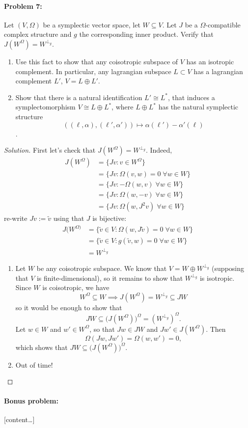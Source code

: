 \paragraph{Problem 7:} Let $(V,\Omega)$ be a symplectic vector space, let $W\subseteq V$. Let $J$ be a $\Omega$-compatible complex structure and $g$ the corresponding inner product. Verify that $J(W^{\Omega} )=W^{\perp_{g}}$.
\begin{enumerate}[label=\alph*.]
	\item Use this fact to show that any coisotropic subspace of $V$ has an isotropic complement. In particular, any lagrangian subspace $L\subset V$ has a lagrangian complement $L'$, $V=L\oplus L'$.
	
\item Show that there is a natural identification $L'\cong L^{*}$, that induces a symplectomorphism $V\cong L\oplus L^{*}$, where $L\oplus L^{*}$ has the natural symplectic structure \[\left( (\ell,\alpha),(\ell',\alpha') \right)\longmapsto\alpha(\ell')-\alpha'(\ell)\].
\end{enumerate}

\begin{proof}[Solution]\leavevmode
	First let's check that $J(W^{\Omega} )=W^{\perp_{g}}$. Indeed,
	\begin{align*}
		J(W^{\Omega} )&= \{Jv:v\in W^{\Omega}\}\\
&=\{Jv:\Omega(v,w)=0\;\forall w\in W\} \\
&=\{Jv:-\Omega(w,v)\;\forall w\in W\} \\
&=\{Jv:\Omega(w,-v)\;\forall w\in W\} \\
&=\{Jv:\Omega(w,J^{2}v)\;\forall w\in W\}
	\end{align*}
re-write $Jv:=\tilde{v}$ using that $J$ is bijective:
	\begin{align*}
J(W^{\Omega)}&=\{\tilde{v}\in V:\Omega(w,J\tilde{v})=0\;\forall w\in W\} \\
&=\{ \tilde{v}\in V:g(\tilde{v},w)=0\;\forall w\in W\} \\
& =W^{\perp_{g}}
	\end{align*}
	\begin{enumerate}[label=\alph*.]
		\item Let $W$ be any coisotropic subspace. We know that $V=W\oplus W^{\perp_g}$ (supposing that $V$ is finite-dimensional), so it remains to show that $W^{\perp_g}$ is isotropic.
		Since $W$ is coisotropic, we have
		\[W^{\Omega}\subseteq W\implies J(W^{\Omega})=W^{\perp_g}\subseteq JW\]
		so it would be enough to show that
		\[JW\subseteq\big(J(W^{\Omega})\big)^{\Omega}=(W^{\perp_g})^{\Omega}.\]
		Let $w\in W$ and $w'\in W^{\Omega}$, so that $Jw\in JW$ and $Jw'\in J(W^{\Omega})$. Then
		\[\Omega(Jw,Jw')=\Omega(w,w')=0,\]
		which shows that $JW\subseteq\big(J(W^{\Omega})\big)^{\Omega}$.

	\item Out of time!
	\end{enumerate}


\end{proof}

\paragraph{Bonus problem: } [content…]

\printbibliography


